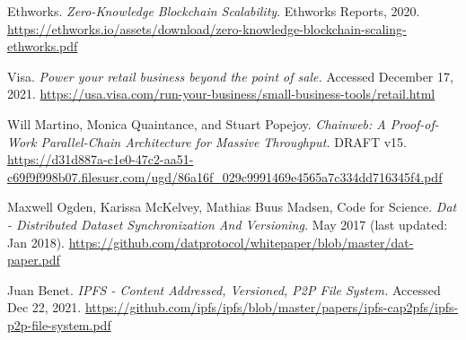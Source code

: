 \documentclass[12pt]{article}
\begin{document}
\begin{thebibliography}{3}


		Ethworks. \textit{Zero-Knowledge Blockchain Scalability}. Ethworks Reports, 2020. \url{https://ethworks.io/assets/download/zero-knowledge-blockchain-scaling-ethworks.pdf}

		Visa. \textit{Power your retail business beyond the point of sale.} Accessed December 17, 2021. \url{https://usa.visa.com/run-your-business/small-business-tools/retail.html}

		Will Martino, Monica Quaintance, and Stuart Popejoy. \textit{Chainweb: A Proof-of-Work Parallel-Chain Architecture for Massive Throughput.} DRAFT v15. \url{https://d31d887a-c1e0-47c2-aa51-c69f9f998b07.filesusr.com/ugd/86a16f_029c9991469e4565a7c334dd716345f4.pdf}

		Maxwell Ogden, Karissa McKelvey, Mathias Buus Madsen, Code for Science. \textit{Dat - Distributed Dataset Synchronization And Versioning.} May 2017 (last updated: Jan 2018). \url{https://github.com/datprotocol/whitepaper/blob/master/dat-paper.pdf}

		Juan Benet. \textit{IPFS - Content Addressed, Versioned, P2P File System.} Accessed Dec 22, 2021. \url{https://github.com/ipfs/ipfs/blob/master/papers/ipfs-cap2pfs/ipfs-p2p-file-system.pdf}


\end{thebibliography}
\end{document}
